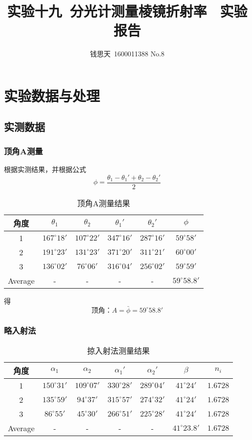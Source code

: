 \documentclass{ctexart}
\author{钱思天\ 1600011388 No.8}
\title{实验十九\ 分光计测量棱镜折射率 \ 实验报告}
\begin{document}
      \maketitle
      \section{实验数据与处理}
      \subsection{实测数据}
      \subsubsection{顶角A测量}
      根据实测结果，并根据公式$$\phi=\frac{\theta_1-\theta_1'+\theta_2-\theta_2'}{2}$$
\begin{table}[H]
  \centering
  \caption{顶角A测量结果}
    \begin{tabular}{|c|c|c|c|c|c|}\hline
    角度    & {$\theta_1$} & {$\theta_2$} & {$\theta_1'$} & {$\theta_2'$} & {$\phi$} \\\hline
   {1} & $167^\circ 18'$ & $107^\circ 22'$ & $347^\circ 16'$ & $287^\circ 16'$ & $59^\circ 58'$ \\\hline
   {2} & $191^\circ 23'$ & $131^\circ 23'$ & $371^\circ 20'$ & $311^\circ 21'$ & $60^\circ 00'$ \\\hline
   {3} & $136^\circ 02'$ & $76^\circ 06'$ & $316^\circ 04'$ & $256^\circ 02'$ & $59^\circ 59'$ \\\hline
    Average &-& -&  -& -&  $59^\circ 58.8'$ \\\hline
    \end{tabular}%
  \label{tab:addlabel}%
\end{table}%

  得$$\mbox{顶角：}A=\bar{\phi}=59^\circ 58.8'$$
  \subsubsection{略入射法}
\begin{table}[H]
  \centering
  \caption{掠入射法测量结果}
    \begin{tabular}{|c|c|c|c|c|c|c|}\hline
    角度    & {$\alpha_1$} & {$\alpha_2$} & {$\alpha_1'$} & {$\alpha_2'$} & {$\beta$} &$n_i$\\\hline
    {1} & $150^\circ 31'$ & $109^\circ 07'$ & $330^\circ 28'$ & $289^\circ 04'$ & $41^\circ 24'$ &$1.6728$\\\hline
    {2} & $135^\circ 59'$ & $94^\circ 37'$ & $315^\circ 57'$ & $274^\circ 32'$ & $41^\circ 24'$ &$1.6728$\\\hline
    {3} & $86^\circ 55'$ & $45^\circ 30'$ & $266^\circ 51'$ & $225^\circ 28'$ & $41^\circ 24'$ &$1.6728$\\\hline
    Average &-& -& -&  -&  $41^\circ 23.8'$ &$1.6728$\\\hline
    \end{tabular}%
  \label{tab:addlabel}%
\end{table}%
\end{document}
